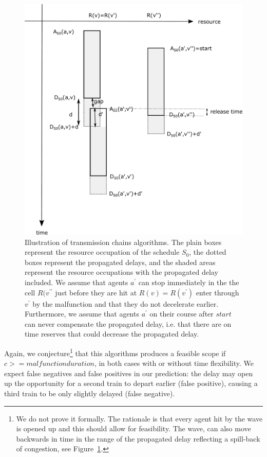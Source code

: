 \documentclass{article}
\begin{document}
\begin{figure}[hbtp]
    \includegraphics[width=\textwidth]{Figures/03_pipeline/transmission_chains.pdf}
	\caption{Illustration of transmission chains algorithms. The plain boxes represent the resource occupation of the schedule $S_0$, the dotted boxes represent the propagated delays, and the shaded areas represent the resource occupations with the propagated delay included. We assume that agents $a^\prime$ can stop immediately in the the cell $R(v^{\prime\prime}$ just before they are hit at $R(v)=R(v^\prime)$ enter through $v^\prime$ by the malfunction and that they do not decelerate earlier. Furthermore, we assume that agents $a^\prime$ on their course after $start$ can never compensate the propagated delay, i.e. that there are on time reserves that could decrease the propagated delay.}
	\label{fig:transmission_chains}
\end{figure}




Again, we conjecture\footnote{We do not prove it formally. The rationale is that every agent hit by the wave is opened up and this should allow for feasibility. The wave, can also move backwards in time in the range of the propagated delay reflecting a spill-back of congestion, see Figure~\ref{fig:transmission_chains}.} that this algorithms produces a feasible scope if $c >= malfunction duration$, in both cases with or without time flexibility.
%
We expect false negatives and false positives in our prediction: the delay may open up the opportunity for a second train to depart earlier (false positive), causing a third train to be only slightly delayed (false negative).
\end{document}
